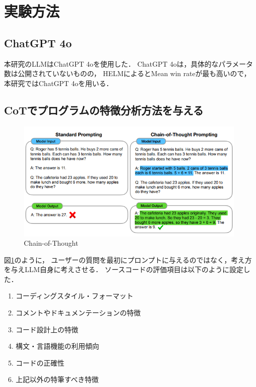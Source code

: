 \documentclass[twocolumn]{jarticle}
\begin{document}
\section{実験方法}

\subsection{ChatGPT 4o}
本研究のLLMはChatGPT 4oを使用した．
ChatGPT 4oは，具体的なパラメータ数は公開されていないものの，
HELM\cite{lit:Percy,lit:helm}によるとMean win rateが最も高いので，
本研究ではChatGPT 4oを用いる．

\subsection{CoTでプログラムの特徴分析方法を与える}

\begin{figure}%
	\begin{center}
	 \includegraphics[scale=0.6]{chain_of_thought_fig_1.png}
	 \caption{Chain-of-Thought}
	 \label{fig:chain_of_thought}
	\end{center}
 \end{figure}

図\ref{fig:chain_of_thought}のように，
ユーザーの質問を最初にプロンプトに与えるのではなく，考え方を与えLLM自身に考えさせる．
ソースコードの評価項目は以下のように設定した．

\begin{enumerate}
	\setlength{\parskip}{0cm} %
	\setlength{\itemsep}{0cm} %
	\item コーディングスタイル・フォーマット
	\item コメントやドキュメンテーションの特徴
	\item コード設計上の特徴
	\item 構文・言語機能の利用傾向
	\item コードの正確性
	\item 上記以外の特筆すべき特徴
\end{enumerate}
\end{document}
